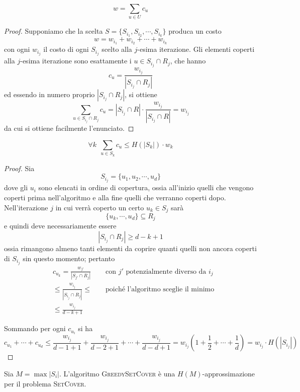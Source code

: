 \begin{lemma}\label{lem:gsetcov_w_sum_c_u}
	$$
		w = \sum_{u \in U} c_u
	$$
\end{lemma}
\begin{proof}
	Supponiamo che la scelta $S = \{S_{i_1}, S_{i_2}, \cdots, S_{i_k}\}$ produca
	un costo
	$$
		w = w_{i_1} + w_{i_2} + \cdots + w_{i_k}
	$$
	con ogni $w_{i_j}$ il costo di ogni $S_{i_j}$ scelto alla $j$-esima iterazione.
	Gli elementi coperti alla $j$-esima iterazione sono esattamente i
	$u \in S_{i_j} \cap R_j$, che hanno
	$$
		c_u = \frac{w_{i_j}}{|S_{i_j} \cap R_j|}
	$$
	ed essendo in numero proprio $|S_{i_j} \cap R_j|$, si ottiene
	$$
		\sum_{u \in S_{i_j} \cap R_j} c_u = |S_{i_j} \cap R| \cdot \frac{w_{i_j}}{|S_{i_j} \cap R|} = w_{i_j}
	$$
	da cui si ottiene facilmente l'enunciato.
\end{proof}
\begin{lemma}\label{lem:gsetcov_cu_leq_harmoskwk}
	$$
		\forall k ~~ \sum_{u \in S_k} c_u \leq H(|S_k|) \cdot w_k
	$$
\end{lemma}
\begin{proof}
	Sia
	$$
		S_{i_j} = \{u_1, u_2, \cdots, u_d\}
	$$
	dove gli $u_i$ sono elencati in ordine di copertura, ossia all'inizio
	quelli che vengono coperti prima nell'algoritmo e alla fine quelli
	che verranno coperti dopo.
	Nell'iterazione $j$ in cui verrà coperto un certo $u_k \in S_j$ sarà
	$$
		\{u_k, \cdots, u_d\} \subseteq R_j
	$$
	e quindi deve necessariamente essere
	$$
		|S_{i_j} \cap R_j| \geq d - k + 1
	$$
	ossia rimangono almeno tanti elementi da coprire quanti quelli non ancora
	coperti di $S_{i_j}$ sin questo momento; pertanto
	\begin{align*}
		 & c_{u_k} = \frac{w_{j'}}{|S_{j'} \cap R_j|}   &  & \text{ con } j' \text{ potenzialmente diverso da } i_j \\
		 & \leq \frac{w_{i_j}}{|S_{i_j} \cap R_j|} \leq &  & \text{ poiché l'algoritmo sceglie il minimo}           \\
		 & \leq \frac{w_{i_j}}{d-k+1}
	\end{align*}

	Sommando per ogni $c_{u_i}$ si ha
	$$
		c_{u_1} + \cdots + c_{u_d} \leq \frac{w_{i_j}}{d-1 + 1} + \frac{w_{i_j}}{d-2+1} + \cdots + \frac{w_{i_j}}{d-d+1}
		= w_{i_j}(1 + \frac{1}{2} + \cdots + \frac{1}{d})
		= w_{i_j} \cdot H(|S_{i_j}|)
	$$
\end{proof}
\begin{theorem}
	Sia $M = \max{|S_i|}$. L'algoritmo \textsc{GreedySetCover} è una $H(M)$-approssimazione per
	il problema \textsc{SetCover}.
\end{theorem}
